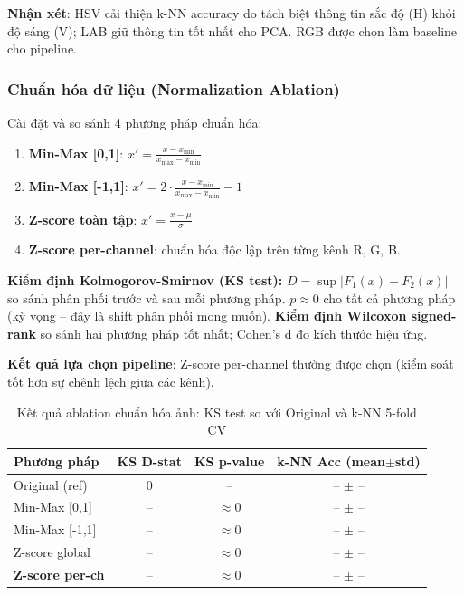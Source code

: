 \documentclass[12pt,a4paper]{article}
\let\oldtextbf\textbf
\renewcommand{\textbf}[1]{\oldtextbf{\textcolor{hcmublue}{#1}}}
\begin{document}
\textbf{Nhận xét}: HSV cải thiện k-NN accuracy do tách biệt thông tin sắc độ (H) khỏi độ sáng (V); LAB giữ thông tin tốt nhất cho PCA. RGB được chọn làm baseline cho pipeline.

\subsubsection{Chuẩn hóa dữ liệu (Normalization Ablation)}

Cài đặt và so sánh 4 phương pháp chuẩn hóa:
\begin{enumerate}
    \item \textbf{Min-Max [0,1]}: $x' = \frac{x - x_{\min}}{x_{\max} - x_{\min}}$
    \item \textbf{Min-Max [-1,1]}: $x' = 2\cdot\frac{x - x_{\min}}{x_{\max} - x_{\min}} - 1$
    \item \textbf{Z-score toàn tập}: $x' = \frac{x - \mu}{\sigma}$
    \item \textbf{Z-score per-channel}: chuẩn hóa độc lập trên từng kênh R, G, B.
\end{enumerate}

\textbf{Kiểm định Kolmogorov-Smirnov (KS test):} $D = \sup|F_1(x) - F_2(x)|$ so sánh phân phối trước và sau mỗi phương pháp. $p \approx 0$ cho tất cả phương pháp (kỳ vọng -- đây là shift phân phối mong muốn). \textbf{Kiểm định Wilcoxon signed-rank} so sánh hai phương pháp tốt nhất; Cohen's d đo kích thước hiệu ứng.

\textbf{Kết quả lựa chọn pipeline}: Z-score per-channel thường được chọn (kiểm soát tốt hơn sự chênh lệch giữa các kênh).

\begin{table}[H]
\centering
\small
\begin{tabular}{|l|c|c|c|}
\hline
\textbf{Phương pháp} & \textbf{KS D-stat} & \textbf{KS p-value} & \textbf{k-NN Acc (mean$\pm$std)} \\ \hline
Original (ref)              & 0        & --            & -- $\pm$ -- \\ \hline
Min-Max {[}0,1{]}           & --       & $\approx 0$   & -- $\pm$ -- \\ \hline
Min-Max {[}-1,1{]}          & --       & $\approx 0$   & -- $\pm$ -- \\ \hline
Z-score global              & --       & $\approx 0$   & -- $\pm$ -- \\ \hline
\textbf{Z-score per-ch}     & --       & $\approx 0$   & -- $\pm$ -- \\ \hline
\end{tabular}
\caption{Kết quả ablation chuẩn hóa ảnh: KS test so với Original và k-NN 5-fold CV}
\label{tab:norm_ablation}
\end{table}
\end{document}
